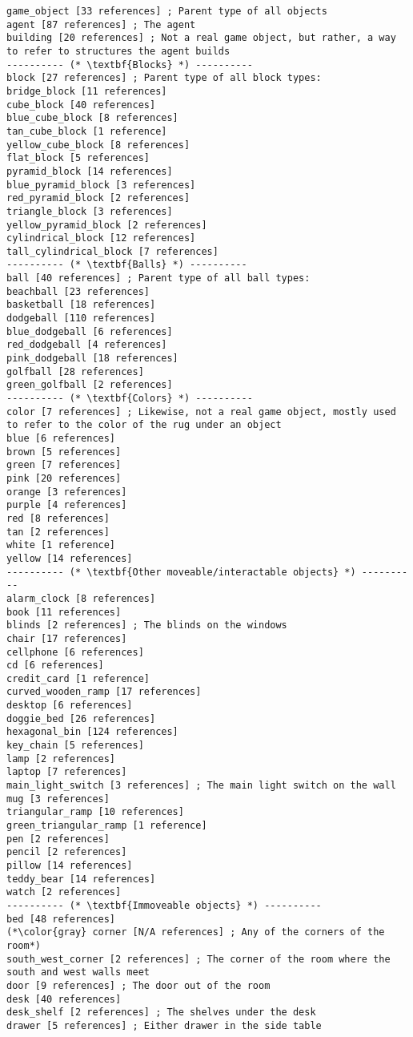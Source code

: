 \documentclass{article}
\begin{document}
\begin{lstlisting}
game_object [33 references] ; Parent type of all objects
agent [87 references] ; The agent
building [20 references] ; Not a real game object, but rather, a way to refer to structures the agent builds
---------- (* \textbf{Blocks} *) ----------
block [27 references] ; Parent type of all block types:
bridge_block [11 references] 
cube_block [40 references] 
blue_cube_block [8 references] 
tan_cube_block [1 reference] 
yellow_cube_block [8 references] 
flat_block [5 references] 
pyramid_block [14 references] 
blue_pyramid_block [3 references] 
red_pyramid_block [2 references] 
triangle_block [3 references] 
yellow_pyramid_block [2 references] 
cylindrical_block [12 references] 
tall_cylindrical_block [7 references] 
---------- (* \textbf{Balls} *) ----------
ball [40 references] ; Parent type of all ball types:
beachball [23 references] 
basketball [18 references] 
dodgeball [110 references] 
blue_dodgeball [6 references] 
red_dodgeball [4 references] 
pink_dodgeball [18 references] 
golfball [28 references] 
green_golfball [2 references] 
---------- (* \textbf{Colors} *) ----------
color [7 references] ; Likewise, not a real game object, mostly used to refer to the color of the rug under an object
blue [6 references] 
brown [5 references] 
green [7 references] 
pink [20 references] 
orange [3 references] 
purple [4 references] 
red [8 references] 
tan [2 references] 
white [1 reference] 
yellow [14 references] 
---------- (* \textbf{Other moveable/interactable objects} *) ----------
alarm_clock [8 references] 
book [11 references] 
blinds [2 references] ; The blinds on the windows
chair [17 references] 
cellphone [6 references] 
cd [6 references] 
credit_card [1 reference] 
curved_wooden_ramp [17 references] 
desktop [6 references] 
doggie_bed [26 references] 
hexagonal_bin [124 references] 
key_chain [5 references] 
lamp [2 references] 
laptop [7 references] 
main_light_switch [3 references] ; The main light switch on the wall
mug [3 references] 
triangular_ramp [10 references] 
green_triangular_ramp [1 reference] 
pen [2 references] 
pencil [2 references] 
pillow [14 references] 
teddy_bear [14 references] 
watch [2 references] 
---------- (* \textbf{Immoveable objects} *) ----------
bed [48 references] 
(*\color{gray} corner [N/A references] ; Any of the corners of the room*)
south_west_corner [2 references] ; The corner of the room where the south and west walls meet
door [9 references] ; The door out of the room
desk [40 references] 
desk_shelf [2 references] ; The shelves under the desk
drawer [5 references] ; Either drawer in the side table

\end{lstlisting}
\end{document}
